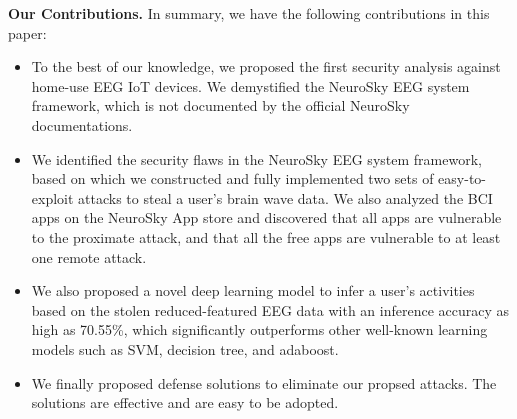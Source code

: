 \indent \textbf{Our Contributions.} In summary, we have the following contributions in this paper:
\begin{itemize}
\item To the best of our knowledge, we proposed the first security analysis against home-use EEG IoT devices. We demystified the NeuroSky EEG system framework, which is not documented by the official NeuroSky documentations.

\item We identified the security flaws in the NeuroSky EEG system framework, based on which we constructed and fully implemented two sets of easy-to-exploit attacks to steal a user's brain wave data. %
We also analyzed the BCI apps on the NeuroSky App store and discovered that all apps are vulnerable to the proximate attack, and that all the free apps are vulnerable to at least one remote attack. %

\item We also proposed a novel deep learning model to infer a user's activities based on the stolen reduced-featured EEG data with an inference accuracy as high as 70.55\%, which significantly outperforms other well-known learning models such as SVM, decision tree, and adaboost.

\item We finally proposed defense solutions to eliminate our propsed attacks. The solutions are effective and are easy to be adopted.
		
\end{itemize}

